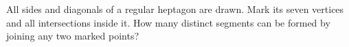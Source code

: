 All sides and diagonals of a regular heptagon are drawn. Mark its seven vertices and all intersections inside it. How many distinct segments can be formed by joining any two marked points?
